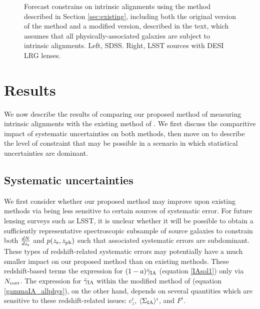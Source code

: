 \documentclass[a4paper,fleqn,usenatbib]{mnras}
\begin{document}
\begin{figure*}
\centering
{}
\caption{Forecast constrains on intrinsic alignments using the method described in Section \ref{sec:existing}, including both the original version of the method and a modified version, described in the text, which assumes that all physically-associated galaxies are subject to intrinsic alignments. Left, SDSS. Right, LSST sources with DESI LRG lenses.}
\label{fig:Fzerocomparison}
\end{figure*}



\section{Results}
\label{sec:results}
\noindent
We now describe the results of comparing our proposed method of measuring intrinsic alignments with the existing method of \cite{Blazek2012}. We first discuss the comparitive impact of systematic uncertainties on both methods, then move on to describe the level of constraint that may be possible in a scenario in which statistical uncertainties are dominant.
\subsection{Systematic uncertainties}
\label{subsec:sysresults}
\noindent
We first consider whether our proposed method may improve upon existing methods via being less sensitive to certain sources of systematic error. For future lensing surveys such as LSST, it is unclear whether it will be possible to obtain a sufficiently representative spectroscopic subsample of source galaxies to constrain both $\frac{dN}{dz_{\rm s}}$ and $p(z_{\rm s}, z_{\rm ph})$ such that associated systematic errors are subdominant. These types of redshift-related systematic errors may potentially have a much smaller impact on our proposed method than on existing methods. These redshift-based terms the expression for $(1-a)\bar{\gamma}_{\rm IA}$ (equation \ref{IAsol1}) only via $N_{\rm corr}$. The expression for $\bar{\gamma}_{\rm IA}$ within the modified method of \cite{Blazek2012} (equation \ref{gammaIA_allphys}), on the other hand, depends on several quantities which are sensitive to these redshift-related issues: $c_z^i$, $\langle \Sigma_{\rm IA} \rangle^i$, and $F^i$. 
\end{document}
